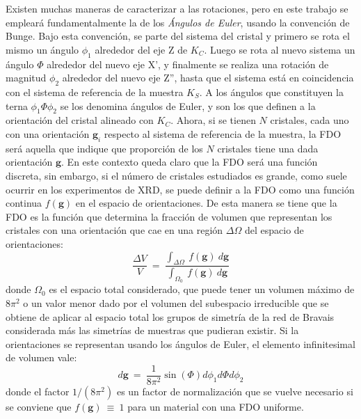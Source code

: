 Existen muchas maneras de caracterizar a las rotaciones, pero en este trabajo se empleará fundamentalmente la de los \textit{Ángulos de Euler}, usando la convención de Bunge\cite{bunge2013texture}.
Bajo esta convención, se parte del sistema del cristal y primero se rota el mismo un ángulo $\phi_1$ alrededor del eje Z de $K_C$.
Luego se rota al nuevo sistema un ángulo $\Phi$ alrededor del nuevo eje X', y finalmente se realiza una rotación de magnitud $\phi_2$ alrededor del nuevo eje Z'', hasta que el sistema está en coincidencia con el sistema de referencia de la muestra $K_S$.
A los ángulos que constituyen la terna $\phi_1 \Phi \phi_2$ se los denomina ángulos de Euler, y son los que definen a la orientación del cristal alineado con $K_C$.
Ahora, si se tienen $N$ cristales, cada uno con una orientación $\mathbf{g}_i$ respecto al sistema de referencia de la muestra, la FDO será aquella que indique que proporción de los $N$ cristales tiene una dada orientación $\mathbf{g}$. 
En este contexto queda claro que la FDO será una función discreta, sin embargo, si el número de cristales estudiados es grande, como suele ocurrir en los experimentos de XRD, se puede definir a la FDO como una función continua $f(\mathbf{g})$ en el espacio de orientaciones.
De esta manera se tiene que la FDO es la función que determina la fracción de volumen que representan los cristales con una orientación que cae en una región $\Delta \Omega$ del espacio de orientaciones\cite{kocks2000texture}:
\begin{equation}
  \frac{\Delta V}{V} \ = \ \frac{\int_{\Delta \Omega} \ f(\mathbf{g}) \ d\mathbf{g}}{\int_{\Omega_0} \ f(\mathbf{g})\ d\mathbf{g}}
  \label{eq:ODF}
\end{equation}
\noindent
donde $\Omega_0$ es el espacio total considerado, que puede tener un volumen máximo de $8\pi^2$ o un valor menor dado por el volumen del subespacio irreducible que se obtiene de aplicar al espacio total los grupos de simetría de la red de Bravais considerada más las simetrías de muestras que pudieran existir.
Si la orientaciones se representan usando los ángulos de Euler, el elemento infinitesimal de volumen vale:
\begin{equation}
  d\mathbf{g} \ = \ \frac{1}{8\pi^2} \sin(\Phi) d\phi_1 d\Phi d\phi_2
  \label{eq:dg}
\end{equation}
\noindent
donde el factor $1/(8\pi^2)$ es un factor de normalización que se vuelve necesario si se conviene que $f(\mathbf{g}) \ \equiv \ 1$ para un material con una FDO uniforme.

